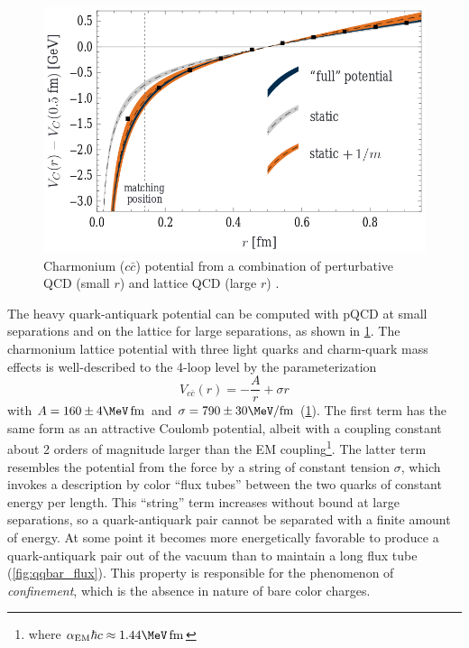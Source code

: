 \begin{figure}[t]
  \includegraphics{ccbar_potential.png}
  \caption{Charmonium ($c\bar{c}$) potential from a combination of perturbative QCD (small $r$) and lattice QCD (large $r$) \cite{Laschka:2011zr}.}
  \label{fig:charmonium_potential}
\end{figure}

The heavy quark-antiquark potential can be computed with \ac{pQCD} at small separations and on the lattice for large separations, as shown in \cref{fig:charmonium_potential}.
The charmonium lattice \qcd potential with three light quarks and charm-quark mass effects is well-described to the 4-loop level by the parameterization \cite{Laschka:2011zr}
\begin{equation}
V_{c\bar{c}}(r) = - \frac{A}{r} + \sigma r
\end{equation}
with $A = 160 \pm 4 \MeV\,\fm$ and $\sigma = 790 \pm 30 \MeV/\fm$ (\cref{fig:charmonium_potential}).
The first term has the same form as an attractive Coulomb potential, albeit with a coupling constant about 2 orders of magnitude larger than the \ac{EM} coupling\footnote{where $\alpha_\textrm{EM} \hbar c \approx 1.44 \MeV\,\fm$}.
The latter term resembles the potential from the force by a string of constant tension $\sigma$, which invokes a description by color ``flux tubes'' between the two quarks of constant energy per length.
This ``string'' term increases without bound at large separations, so a quark-antiquark pair cannot be separated with a finite amount of energy.
At some point it becomes more energetically favorable to produce a quark-antiquark pair out of the vacuum than to maintain a long flux tube (\cref{fig:qqbar_flux}).
This property is responsible for the phenomenon of \emph{confinement}, which is the absence in nature of bare color charges.

